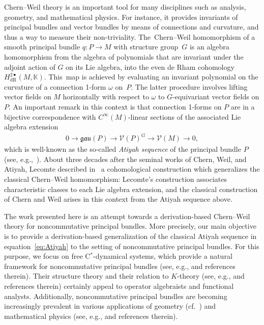 \documentclass[pdftex]{sigma}
\numberwithin{equation}{section}
\newcommand*{\Star}{$^*$\nobreakdash}
\begin{document}
Chern--Weil theory is an important tool for many disciplines such as analysis, geometry, and mathematical physics.
For instance, it provides invariants of principal bundles and vector bundles by means of connections and curvature, and thus a way to measure their non-triviality. The~Chern--Weil homomorphism of a smooth principal bundle $q\colon P \to M$ with structure group~$G$ is an algebra homomorphism from the algebra of polynomials that are invariant under the adjoint action of $G$ on its Lie algebra, into the even de Rham cohomology $H_{\text{dR}}^{2\bullet}(M,\mathbb{K})$.
This~map is achieved by evaluating an invariant polynomial on the curvature of a connection 1-form $\omega$ on~$P$.
The latter procedure involves lifting vector fields on $M$ horizontally with respect to $\omega$ to $G$-equivariant vector fields on $P$.
An important remark in this context is that connection 1-forms on $P$ are in a bijective correspondence with $C^{\infty}(M)$-linear sections of the associated Lie algebra extension
\begin{gather}
	0 \longrightarrow \mathfrak{gau}(P)\longrightarrow \mathcal{V}(P)^G\longrightarrow \mathcal{V}(M) \longrightarrow 0, \label{eq:Atiyah}
\end{gather}
which is well-known as the so-called \emph{Atiyah sequence} of the principal bundle $P$ (see, e.g.,~\cite{Ati57,Kob69II}).
About three decades after the seminal works of Chern, Weil, and Atiyah, Lecomte described in~\cite{Lec85} a cohomological construction which generalizes the classical Chern--Weil homomorphism: Lecomte's construction associates characteristic classes to each Lie algebra extension, and the classical construction of Chern and Weil arises in this context from the Atiyah sequence above.

The work presented here is an attempt towards a derivation-based Chern--Weil theory for noncommutative principal bundles.
More precisely, our main objective is to provide a derivation-based generalization of the classical Atiyah sequence in equation~\eqref{eq:Atiyah} to the setting of noncommutative principal bundles.
For this purpose, we focus on free C\Star-dynamical systems, which provide a natural framework for noncommutative principal bundles (see, e.g., \cite{BaCoHa15,Ell00,Phi87,SchWa17c} and references therein).
Their structure theory and their relation to $K$-theory (see, e.g., \cite{CoYa13a,ForRen19,SchWa17a,SchWa17b,SchWa17c} and references therein) certainly appeal to operator algebraists and functional analysts.
Additionally, noncommutative principal bundles are becoming increasingly prevalent in various applications of geometry (cf.~\cite{IoMa16,Ivan17,Meir18,SchWa20,SchWa21}) and mathematical physics (see, e.g., \cite{BaHa-etal07,CacMes19,DaSi13,DaSiZu14,EchNeOy09,HaMa10,LaSu05,Wahl10} and references therein).
\end{document}
